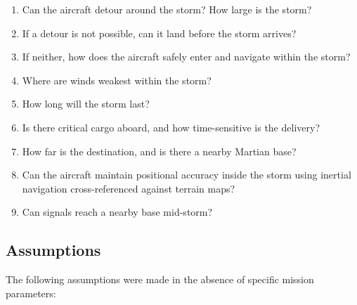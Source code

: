 \documentclass[a4paper,12pt]{article}
\begin{document}
\begin{enumerate}[itemsep=0.3em]
    \item Can the aircraft detour around the storm? How large is the storm?
    \item If a detour is not possible, can it land before the storm arrives?
    \item If neither, how does the aircraft safely enter and navigate within the storm?
    \item Where are winds weakest within the storm?
    \item How long will the storm last?
    \item Is there critical cargo aboard, and how time-sensitive is the delivery?
    \item How far is the destination, and is there a nearby Martian base?
    \item Can the aircraft maintain positional accuracy inside the storm using inertial navigation
    cross-referenced against terrain maps?
    \item Can signals reach a nearby base mid-storm?
\end{enumerate}

\subsection{Assumptions}
The following assumptions were made in the absence of specific mission parameters:
\end{document}
